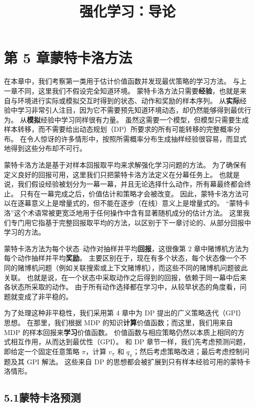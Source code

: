 \documentclass[UTF8,12pt,a4paper,fontset=fandol]{ctexart}
\title{强化学习：导论}
\author{}
\date{}
\begin{document}
\maketitle

\section*{第 5 章\quad 蒙特卡洛方法}

在本章中，我们考察第一类用于估计价值函数并发现最优策略的学习方法。
与上一章不同，这里我们不假设完全知道环境。
蒙特卡洛方法只需要\textbf{经验}，也就是来自与环境进行实际或模拟交互时得到的状态、动作和奖励的样本序列。
从\textbf{实际}经验中学习非常引人注目，因为它不需要预先知道环境动态，却仍然能够得到最优行为。
从\textbf{模拟}经验中学习同样很有力量。
虽然这需要一个模型，但模型只需要生成样本转移，而不需要给出动态规划（DP）所要求的所有可能转移的完整概率分布。
在令人惊讶的许多情形中，按照所需概率分布生成抽样经验很容易，而显式地得到这些分布却不可行。

蒙特卡洛方法是基于对样本回报取平均来求解强化学习问题的方法。
为了确保有定义良好的回报可用，这里我们只把蒙特卡洛方法定义在分幕任务上。
也就是说，我们假设经验被划分为一幕一幕，并且无论选择什么动作，所有幕最终都会终止。
只有在一幕完成之后，价值估计和策略才会被改变。
因此，蒙特卡洛方法可以在逐幕意义上是增量式的，但不能在逐步（在线）意义上是增量式的。
“蒙特卡洛”这个术语常被更宽泛地用于任何操作中含有显著随机成分的估计方法。
这里我们专门用它指基于完整回报取平均的方法，以区别于下一章讨论的、从部分回报中学习的方法。

蒙特卡洛方法为每个状态--动作对抽样并平均\textbf{回报}，这很像第 2 章中赌博机方法为每个动作抽样并平均\textbf{奖励}。
主要区别在于，现在有多个状态，每个状态像一个不同的赌博机问题（例如关联搜索或上下文赌博机），而这些不同的赌博机问题彼此关联。
也就是说，在一个状态中采取动作之后得到的回报，依赖于同一幕中后来各状态所采取的动作。
由于所有动作选择都在学习中，从较早状态的角度看，问题就变成了非平稳的。

为了处理这种非平稳性，我们采用第 4 章中为 DP 提出的广义策略迭代（GPI）思想。
在那里，我们根据 MDP 的知识\textbf{计算}价值函数；而这里，我们用来自 MDP 的样本回报来\textbf{学习}价值函数。
价值函数与相应策略仍然以本质上相同的方式相互作用，从而达到最优性（GPI）。
和 DP 章节一样，我们先考虑预测问题，即给定一个固定任意策略 $\pi$，计算 $v_\pi$ 和 $q_\pi$；然后考虑策略改进；最后考虑控制问题及其 GPI 解法。
这些来自 DP 的思想都会被扩展到只有样本经验可用的蒙特卡洛情形。

\subsection*{5.1\quad 蒙特卡洛预测}
\end{document}
